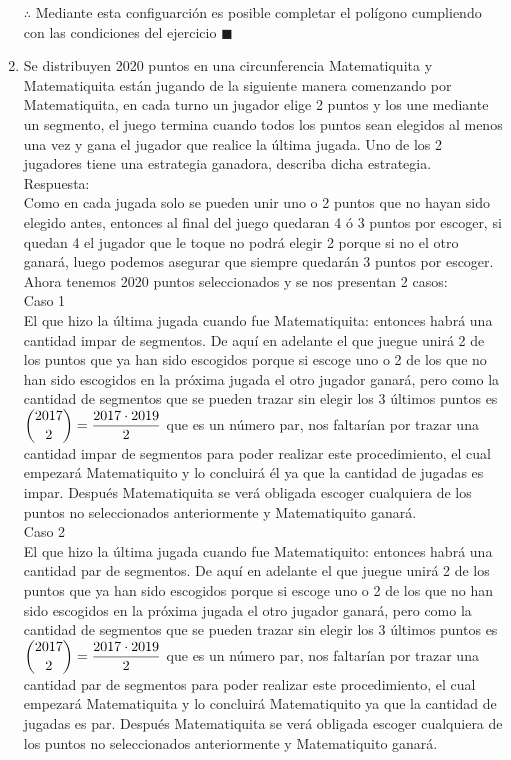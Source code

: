 \documentclass{book}
\begin{document}
\begin{enumerate}
			$\therefore$ Mediante esta configuarción es posible completar el polígono cumpliendo con las condiciones del ejercicio $\blacksquare$\\
			\item Se distribuyen 2020 puntos en una circunferencia Matematiquita y Matematiquita están jugando de la siguiente manera comenzando por Matematiquita, en cada turno un jugador elige 2 puntos y los une mediante un segmento, el juego termina cuando todos los puntos sean elegidos al menos una vez y gana el jugador que realice la última jugada. Uno de los 2 jugadores tiene una estrategia ganadora, describa dicha estrategia.\\
			Respuesta:\\
			Como en cada jugada solo se pueden unir uno o 2 puntos que no hayan sido elegido antes, entonces al final del juego quedaran 4 ó 3 puntos por escoger, si quedan 4 el jugador que le toque no podrá elegir 2 porque si no el otro ganará, luego podemos asegurar que siempre quedarán 3 puntos por escoger. Ahora tenemos 2020 puntos seleccionados y se nos presentan 2 casos:\\
			Caso 1\\
			El que hizo la última jugada cuando fue Matematiquita: entonces habrá una cantidad impar de segmentos. De aquí en adelante el que juegue unirá 2 de los puntos que ya han sido escogidos porque si escoge uno o 2 de los que no han sido escogidos en la próxima jugada el otro jugador ganará, pero como la cantidad de segmentos que se pueden trazar sin elegir los 3 últimos puntos es $\displaystyle{{2017 \choose 2}={2017\cdot 2019\over 2}}$ que es un número par, nos faltarían por trazar una cantidad impar de segmentos para poder realizar este procedimiento, el cual empezará Matematiquito y lo concluirá él ya que la cantidad de jugadas es impar. Después Matematiquita se verá obligada escoger cualquiera de los puntos no seleccionados anteriormente y Matematiquito ganará.\\
			Caso 2\\
			El que hizo la última jugada cuando fue Matematiquito: entonces habrá una cantidad par de segmentos. De aquí en adelante el que juegue unirá 2 de los puntos que ya han sido escogidos porque si escoge uno o 2 de los que no han sido escogidos en la próxima jugada el otro jugador ganará, pero como la cantidad de segmentos que se pueden trazar sin elegir los 3 últimos puntos es $\displaystyle{{2017 \choose 2}={2017\cdot 2019\over 2}}$ que es un número par, nos faltarían por trazar una cantidad par de segmentos para poder realizar este procedimiento, el cual empezará Matematiquita y lo concluirá Matematiquito ya que la cantidad de jugadas es par. Después Matematiquita se verá obligada escoger cualquiera de los puntos no seleccionados anteriormente y Matematiquito ganará.\\

\end{enumerate}
\end{document}
